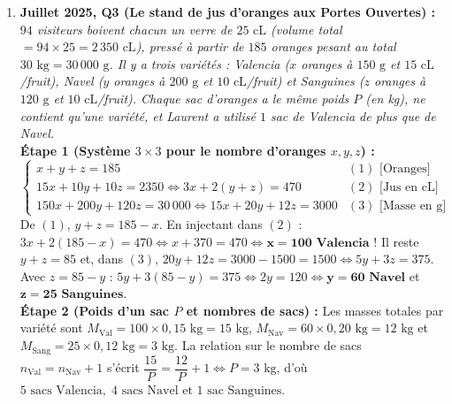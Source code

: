 \begin{exemple}
\begin{enumerate}
    \item \textbf{Juillet 2025, Q3 (Le stand de jus d'oranges aux Portes Ouvertes) :}
    \emph{$94$ visiteurs boivent chacun un verre de $25\text{ cL}$ (volume total $= 94 \times 25 = 2\,350\text{ cL}$), pressé à partir de $185$ oranges pesant au total $30\text{ kg} = 30\,000\text{ g}$. Il y a trois variétés : Valencia ($x$ oranges à $150\text{ g}$ et $15\text{ cL}$/fruit), Navel ($y$ oranges à $200\text{ g}$ et $10\text{ cL}$/fruit) et Sanguines ($z$ oranges à $120\text{ g}$ et $10\text{ cL}$/fruit). Chaque sac d'oranges a le même poids $P$ (en kg), ne contient qu'une variété, et Laurent a utilisé $1$ sac de Valencia de plus que de Navel.}\\
    \textbf{Étape 1 (Système $3 \times 3$ pour le nombre d'oranges $x, y, z$) :}
    \[
        \begin{cases}
            x + y + z = 185 & (1) \text{ [Oranges]} \\
            15x + 10y + 10z = 2350 \iff 3x + 2(y + z) = 470 & (2) \text{ [Jus en cL]} \\
            150x + 200y + 120z = 30\,000 \iff 15x + 20y + 12z = 3000 & (3) \text{ [Masse en g]}
        \end{cases}
    \]
    De $(1)$, $y + z = 185 - x$. En injectant dans $(2)$ : $3x + 2(185 - x) = 470 \iff x + 370 = 470 \iff \mathbf{x = 100\text{ Valencia}}$ !
    Il reste $y + z = 85$ et, dans $(3)$, $20y + 12z = 3000 - 1500 = 1500 \iff 5y + 3z = 375$. Avec $z = 85 - y$ : $5y + 3(85 - y) = 375 \iff 2y = 120 \iff \mathbf{y = 60\text{ Navel}}$ et $\mathbf{z = 25\text{ Sanguines}}$.\\
    \textbf{Étape 2 (Poids d'un sac $P$ et nombres de sacs) :} Les masses totales par variété sont $M_{\text{Val}} = 100 \times 0,15\text{ kg} = 15\text{ kg}$, $M_{\text{Nav}} = 60 \times 0,20\text{ kg} = 12\text{ kg}$ et $M_{\text{Sang}} = 25 \times 0,12\text{ kg} = 3\text{ kg}$.
    La relation sur le nombre de sacs $n_{\text{Val}} = n_{\text{Nav}} + 1$ s'écrit $\dfrac{15}{P} = \dfrac{12}{P} + 1 \iff \boxed{P = 3\text{ kg}}$, d'où $\boxed{5\text{ sacs Valencia},\; 4\text{ sacs Navel et } 1\text{ sac Sanguines}}$.


\end{enumerate}
\end{exemple}

